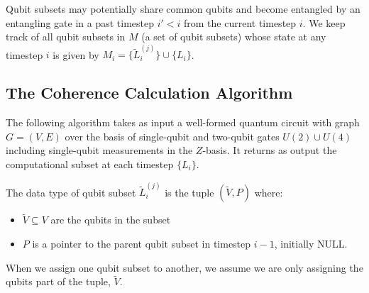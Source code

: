Qubit subsets may potentially share common qubits and become entangled by an entangling gate
in a past timestep $i' < i$ from the current timestep $i$.
We keep track of all qubit subsets in $M$ (a set of qubit subsets) whose state at any
timestep $i$ is given by $M_i = \{\tilde{L}^{(j)}_i\} \cup \{ L_i \}$.

\subsection{The Coherence Calculation Algorithm}
\label{subsec:cohere-algo}

The following algorithm takes as input a well-formed quantum circuit
with graph $G = (V,E)$ over the basis of single-qubit and two-qubit gates
$U(2) \cup U(4)$ including single-qubit measurements in the $Z$-basis.
It returns as output the computational subset at each timestep $\{ L_i \}$.

The data type of qubit subset $\tilde{L}^{(j)}_i$ is the tuple
$(\tilde{V}, P)$ where:

\begin{itemize}
\item $\tilde{V} \subseteq V$ are the qubits in the subset
\item $P$ is a pointer to the parent qubit subset in timestep ${i-1}$, initially \textsc{NULL}.
\end{itemize}

When we assign one qubit subset to another, we assume we are only assigning the qubits part of the tuple, $\tilde{V}$.

